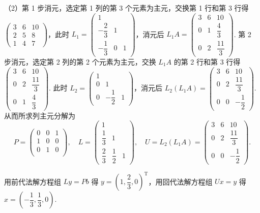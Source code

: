 \documentclass[UTF8]{ctexart}
\begin{document}
（2）第 1 步消元，选定第 1 列的第 3 个元素为主元，交换第 1 行和第 3 行得 $\begin{pmatrix}
    3 & 6 & 10\\
    2 & 5 & 8\\
    1 & 4 & 7
\end{pmatrix}$，此时 $L_1=\begin{pmatrix}
    1 \\
    -\dfrac{2}{3} & 1 \\
    -\dfrac{1}{3} & 0 & 1
\end{pmatrix}$，消元后 $L_1A=\begin{pmatrix}
    3 & 6 & 10\\
    0 & 1 & \dfrac43\\
    0 & 2 & \dfrac{11}{3}
\end{pmatrix}$. 第 2 步消元，选定第 2 列的第 2 个元素为主元，交换 $L_1A$ 的第 2 行和第 3 行得 $\begin{pmatrix}
    3 & 6 & 10 \\
    0 & 2 & \dfrac{11}{3} \\
    0 & 1 & \dfrac43
\end{pmatrix}$. 此时 $L_2=\begin{pmatrix}
    1 \\
    0 & 1 \\
    0 & -\dfrac12 & 1
\end{pmatrix}$，消元后 $L_2(L_1A)=\begin{pmatrix}
    3 & 6 & 10 \\
    0 & 2 & \dfrac{11}{3} \\
    0 & 0 & -\dfrac12
\end{pmatrix}$. 从而所求列主元分解为
\[P=\begin{pmatrix}
    0 & 0 & 1 \\
    1 & 0 & 0 \\
    0 & 1 & 0 \\
\end{pmatrix},\quad L=\begin{pmatrix}
    1 \\
    \dfrac13 & 1 \\
    \dfrac23 & \dfrac12 & 1
\end{pmatrix},\quad U=L_2(L_1A)=\begin{pmatrix}
    3 & 6 & 10 \\
    0 & 2 & \dfrac{11}{3} \\
    0 & 0 & -\dfrac12
\end{pmatrix}.\]

用前代法解方程组 $Ly=Pb$ 得 $y=\left(1,\dfrac23,0\right)^{\mathrm{T}}$，用回代法解方程组 $Ux=y$ 得 $x=\left(-\dfrac13,\dfrac13,0\right)$.
\end{document}
